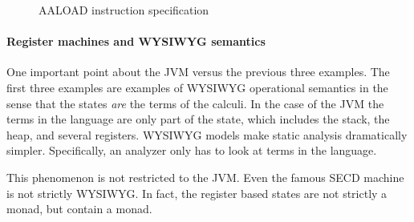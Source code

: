 \begin{figure}[h!]
  \caption{AALOAD instruction specification}
  \label{fig:AALOADSpec}
\end{figure}

\paragraph{Register machines and WYSIWYG semantics}One important point about the JVM versus the previous three
examples. The first three examples are examples of WYSIWYG operational
semantics in the sense that the states \emph{are} the terms of the
calculi. In the case of the JVM the terms in the language are only
part of the state, which includes the stack, the heap, and several
registers. WYSIWYG models make static analysis dramatically
simpler. Specifically, an analyzer only has to look at terms in the
language.

This phenomenon is not restricted to the JVM. Even the famous SECD machine is not strictly WYSIWYG. In fact, the register based states are not strictly a monad, but contain a monad.
